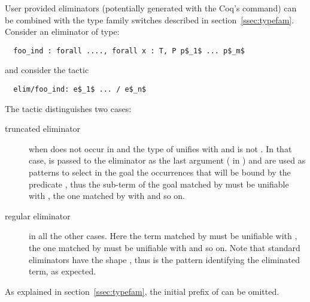 User provided eliminators (potentially generated with the 
 Coq's command) can be combined with the type family switches
described in section~\ref{ssec:typefam}. Consider an eliminator 
 of type:
\begin{lstlisting}
  foo_ind : forall ...., forall x : T, P p$_1$ ... p$_m$
\end{lstlisting}
and consider the tactic
\begin{lstlisting}
  elim/foo_ind: e$_1$ ... / e$_n$
\end{lstlisting}
The  tactic distinguishes two cases:
\begin{description}
\item[truncated eliminator] when  does not occur in  
  and the type of  unifies with  and  is not \C{_}.
  In that case,  is passed to the eliminator as the last argument
  ( in ) and  are used as patterns
  to select in the goal the occurrences that will be bound by the 
  predicate , thus the sub-term of the goal matched by  
  must be unifiable with , the one matched by  with
   and so on.
\item[regular eliminator] in all the other cases. Here the term matched by
   must be unifiable with , the one matched by
   must be unifiable with  and so on. Note that 
  standard eliminators have the shape , thus
   is the pattern identifying the eliminated term, as expected.
\end{description}
As explained in  section~\ref{ssec:typefam}, the initial prefix of
 can be omitted.

